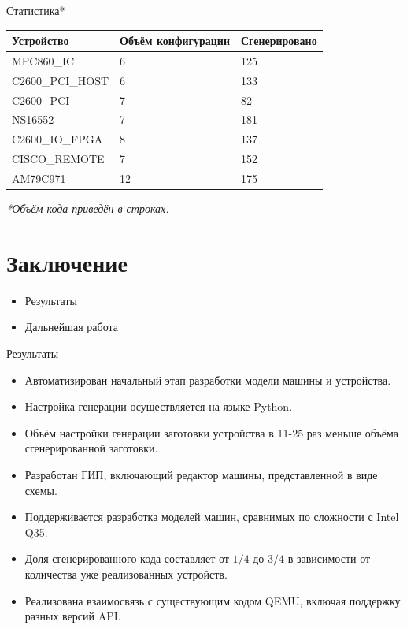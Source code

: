 \documentclass[unicode,hyperref={unicode=true}]{beamer}
\newcommand*{\sectionpagekb}{\usebeamertemplate*{section page kb}}
\theoremstyle{definition}
\theoremstyle{plain}
\begin{document}
\begin{frame}{Статистика*}
\begin{center}
\begin{tabular}{l|ll}
Устройство        & Объём конфигурации & Сгенерировано \\
\hline
MPC860\_IC        & 6                  & 125           \\
C2600\_PCI\_HOST  & 6                  & 133           \\
C2600\_PCI        & 7                  & 82            \\
NS16552           & 7                  & 181           \\
C2600\_IO\_FPGA   & 8                  & 137           \\
CISCO\_REMOTE     & 7                  & 152           \\
AM79C971          & 12                 & 175           \\
\end{tabular}
\end{center}
\vfill
\it{*Объём кода приведён в строках.}
\end{frame}



\section{Заключение}
\begin{frame}
\sectionpagekb
\begin{itemize}
\item Результаты
\item Дальнейшая работа
\end{itemize}
\end{frame}



\begin{frame}{Результаты}
\begin{itemize}
\item Автоматизирован начальный этап разработки модели машины и устройства.
\item Настройка генерации осуществляется на языке Python.
\item Объём настройки генерации заготовки устройства в 11-25 раз меньше объёма
сгенерированной заготовки.
\item Разработан ГИП, включающий редактор машины, представленной в виде схемы.
\item Поддерживается разработка моделей машин, сравнимых по сложности с
Intel Q35.
\item Доля сгенерированного кода составляет от \(1/4\) до \(3/4\) в зависимости
от количества уже реализованных устройств.
\item Реализована взаимосвязь с существующим кодом QEMU, включая поддержку
разных версий API.
\end{itemize}
\end{frame}
\end{document}
